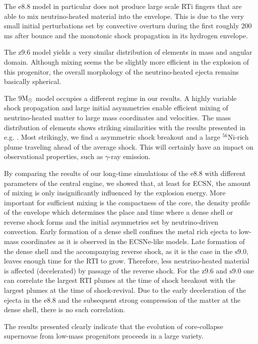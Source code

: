 \documentclass[fleqn,usenatbib]{mnras}
\newcommand{\nickel}{\ensuremath{\mathrm{^{56}Ni}}\xspace}
\newcommand{\solm}{\ensuremath{\rm{M_{\odot}}}\xspace}
\newcommand{\onemg}{\ensuremath{\mathrm{e8.8}}\xspace}
\newcommand{\snine}{\ensuremath{\mathrm{s9.0}}\xspace}
\newcommand{\znine}{\ensuremath{\mathrm{z9.6}}\xspace}
\begin{document}
The \onemg model in particular does not produce large scale RTi fingers 
that are able to mix neutrino-heated material into the envelope. This is 
due to the very small initial perturbations set by convective overturn 
during the first roughly 200 ms after bounce and the monotonic shock 
propagation in its hydrogen envelope. 

The \znine model yields a very similar distribution of elements in mass 
and angular domain. Although mixing seems the be slightly more efficient
in the explosion of this progenitor, the overall morphology of the neutrino-heated
ejecta remains basically spherical.

The $9\solm$ model occupies a different regime in our results. 
A highly variable shock propagation and large initial asymmetries
enable efficient mixing of neutrino-heated matter to large
mass coordinates and velocities. The mass distribution of elements
shows striking similarities with the results presented in e.g.
\cite{Wongwathanarat2015}. 
Most strikingly, we find a asymmetric shock breakout and a large
$\nickel$-rich plume traveling ahead of the average shock. 
This will certainly have an impact on observational properties,
such as $\gamma$-ray emission.

By comparing the results of our long-time simulations of the \onemg 
with different parameters of the central engine, we showed that, 
at least for ECSN, the amount of mixing is only insignificantly 
influenced by the explosion energy. 
More important for sufficient mixing is the compactness of the core, 
the density profile of the envelope which determines the place and 
time where a dense shell or reverse shock forms and the initial 
asymmetries set by neutrino-driven convection.
Early formation of a dense shell confines the metal rich ejecta to 
low-mass coordinates as it is observed in the ECSNe-like models. 
Late formation of the dense shell and the accompanying reverse shock, 
as it is the case in the \snine, leaves enough time for the RTI to grow. 
Therefore, less neutrino-heated material is affected (decelerated)
by passage of the reverse shock.
For the \znine and \snine one can correlate the largest RTI plumes at 
the time of shock breakout with the largest plumes at the time of shock-revival. 
Due to the early deceleration of the ejecta in the \onemg and the subsequent 
strong compression of the matter at the dense shell, there is no such correlation. 

The results presented clearly indicate that the evolution of 
core-collapse supernovae from low-mass progenitors proceeds in a large variety. 
\end{document}
